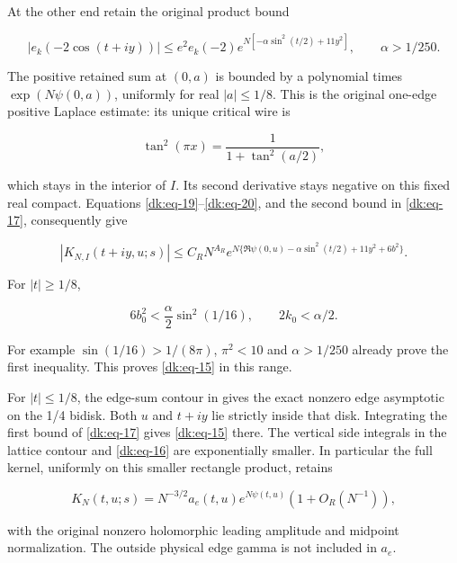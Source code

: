 At the other end retain the original product bound

\begin{equation}\label{dk:eq-20}
|e_k(-2\cos(t+iy))|
   \le e^2e_k(-2)e^{N[-\alpha\sin^2(t/2)+11y^2]},
                       \qquad \alpha>1/250.
\end{equation}

The positive retained sum at \((0,a)\) is bounded by a polynomial times
\(\exp(N\psi(0,a))\), uniformly for real \(|a|\le1/8\). This is the original
one-edge positive Laplace estimate: its unique critical wire is

\begin{equation}\label{dk:eq-21}
\tan^2(\pi x)=\frac1{1+\tan^2(a/2)},
\end{equation}

which stays in the interior of \(I\). Its second derivative stays negative
on this fixed real compact. Equations \eqref{dk:eq-19}--\eqref{dk:eq-20}, and the second bound
in \eqref{dk:eq-17}, consequently give

\begin{equation}\label{dk:eq-22}
|K_{N,I}(t+iy,u;s)|\le C_RN^{A_R}
 e^{N\{\Re\psi(0,u)-\alpha\sin^2(t/2)+11y^2+6b^2\}}.
\end{equation}

For \(|t|\ge1/8\),

\begin{equation}\label{dk:eq-23}
6b_0^2<\frac{\alpha}{2}\sin^2(1/16),\qquad
                         2k_0<\alpha/2.
\end{equation}

For example \(\sin(1/16)>1/(8\pi)\), \(\pi^2<10\) and \(\alpha>1/250\) already
prove the first inequality. This proves \eqref{dk:eq-15} in this range.

For \(|t|\le1/8\), the edge-sum contour in \cite[Section~3]{CircleTreeVolume} gives the exact
nonzero edge asymptotic on the 1/4 bidisk. Both \(u\) and \(t+iy\) lie strictly
inside that disk. Integrating the first bound of \eqref{dk:eq-17} gives \eqref{dk:eq-15} there.
The vertical side integrals in the lattice contour and \eqref{dk:eq-16} are exponentially smaller.
In particular the full kernel, uniformly on this smaller rectangle
product, retains

\begin{equation}\label{dk:eq-24}
K_N(t,u;s)=N^{-3/2}a_e(t,u)e^{N\psi(t,u)}
                         (1+O_R(N^{-1})),
\end{equation}

with the original nonzero holomorphic leading amplitude and midpoint
normalization. The outside physical edge gamma is not included in \(a_e\).

